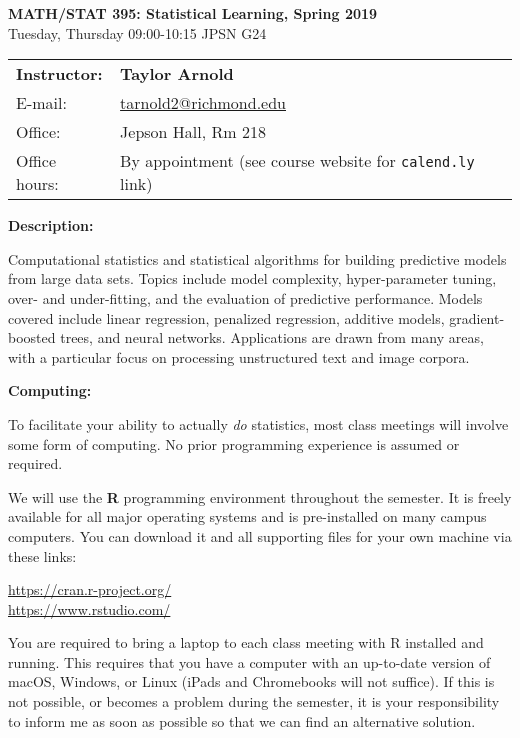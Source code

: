 \documentclass[12pt]{article}
\begin{document}
\begin{center}
{\bf MATH/STAT 395: Statistical Learning, Spring 2019} \\
Tuesday, Thursday 09:00-10:15 \quad JPSN G24
\end{center}

\bigskip

\noindent
\begin{tabular}{ l l }
{\bf Instructor:} &  {\bf Taylor Arnold} \\
E-mail: & \href{mailto:tarnold2@richmond.edu}{tarnold2@richmond.edu} \\
Office: & Jepson Hall, Rm 218 \\
Office hours: & By appointment (see course website for \texttt{calend.ly} link)
\end{tabular}

\vspace{0.5cm}

\textbf{Description:} \vspace{6pt}

Computational statistics and statistical algorithms for building predictive
models from large data sets. Topics include model complexity, hyper-parameter
tuning, over- and under-fitting, and the evaluation of predictive performance.
Models covered include linear regression, penalized regression, additive
models, gradient-boosted trees, and neural networks. Applications are drawn
from many areas, with a particular focus on processing unstructured text and
image corpora.

\bigskip

\textbf{Computing:} \vspace{6pt}

To facilitate your ability to actually \textit{do} statistics, most class
meetings will involve some form of computing. No prior programming experience
is assumed or required.

\medskip

We will use the \textbf{R} programming environment throughout the
semester. It is freely available for all major operating systems and
is pre-installed on many campus computers. You can download it and
all supporting files for your own machine via these links:
\begin{center}
\url{https://cran.r-project.org/} \\
\url{https://www.rstudio.com/}
\end{center}
You are required to bring a laptop to each class meeting with R installed
and running. This requires that you have a computer with an up-to-date
version of macOS, Windows, or Linux (iPads and Chromebooks will not suffice).
If this is not possible, or becomes a problem during the semester, it is your
responsibility to inform me as soon as possible so that we can find an
alternative solution.
\end{document}

